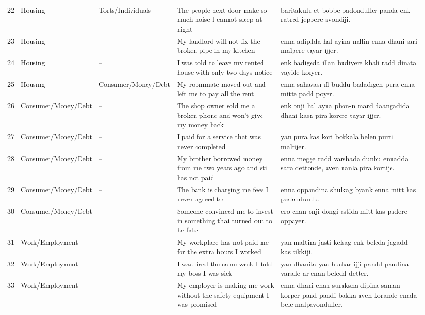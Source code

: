 \documentclass[11pt]{article}
\begin{document}
\begin{longtable}{p{} p{} p{} p{} p{}}
22 & Housing & Torts/\allowbreak Individuals & The people next door make so much noise I cannot sleep at night & baritakulu et bobbe padonduller panda enk ratred jeppere avondiji. \\
23 & Housing & -- & My landlord will not fix the broken pipe in my kitchen & enna adipilda hal ayina nallin enna dhani sari malpere tayar ijjer. \\
24 & Housing & -- & I was told to leave my rented house with only two days notice & enk badigeda illan budiyere khali radd dinata vayide koryer. \\
25 & Housing & Consumer/\allowbreak Money/\allowbreak Debt & My roommate moved out and left me to pay all the rent & enna sahavasi ill buddu badadigen pura enna mitte padd poyer. \\
26 & Consumer/\allowbreak Money/\allowbreak Debt & -- & The shop owner sold me a broken phone and won't give my money back & enk onji hal ayna phon-n mard daangadida dhani kasn pira korere tayar ijjer. \\
27 & Consumer/\allowbreak Money/\allowbreak Debt & -- & I paid for a service that was never completed & yan pura kas kori bokkala belen purti maltijer. \\
28 & Consumer/\allowbreak Money/\allowbreak Debt & -- & My brother borrowed money from me two years ago and still has not paid & enna megge radd varshada dunbu ennadda sara dettonde, aven nanla pira kortije. \\
29 & Consumer/\allowbreak Money/\allowbreak Debt & -- & The bank is charging me fees I never agreed to & enna oppandina shulkag byank enna mitt kas padondundu. \\
30 & Consumer/\allowbreak Money/\allowbreak Debt & -- & Someone convinced me to invest in something that turned out to be fake & ero enan onji dongi astida mitt kas padere oppayer. \\
31 & Work/\allowbreak Employment & -- & My workplace has not paid me for the extra hours I worked & yan maltina jasti kelsag enk beleda jagadd kas tikkiji. \\
32 & Work/\allowbreak Employment & -- & I was fired the same week I told my boss I was sick & yan dhanita yan hushar ijji pandd pandina varade ar enan beledd detter. \\
33 & Work/\allowbreak Employment & -- & My employer is making me work without the safety equipment I was promised & enna dhani enan suraksha dipina saman korper pand pandi bokka aven korande enada bele malpavonduller. \\

\end{longtable}
\end{document}
